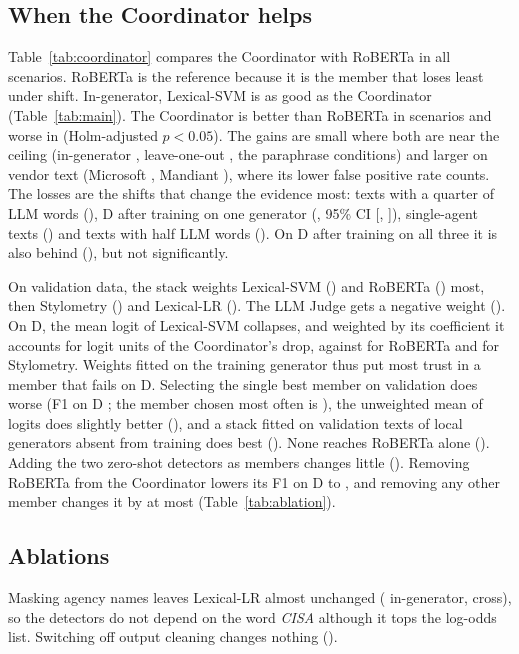 \documentclass[journal]{IEEEtran}
\begin{document}

\subsection{When the Coordinator helps}
Table~\ref{tab:coordinator} compares the Coordinator with RoBERTa in all \GapN{} scenarios. RoBERTa is the
reference because it is the member that loses least under shift. In-generator, Lexical-SVM is as good as the
Coordinator (Table~\ref{tab:main}). The Coordinator is better than RoBERTa in \GapWins{} scenarios and worse in
\GapLosses{} (Holm-adjusted $p<0.05$). The gains are small where both are near the ceiling (in-generator
\GapInGenerator{}, leave-one-out \GapLeaveOneOut{}, the paraphrase conditions) and larger on vendor text (Microsoft
\GapMicrosoftAbc{}, Mandiant \GapMandiantAbc{}), where its lower false positive rate counts. The losses are the
shifts that change the evidence most: texts with a quarter of LLM words (\GapTwoFiveLlmAbc{}), D after training on
one generator (\GapDOneGenerator{}, 95\% CI [\GapLoDOneGenerator{}, \GapHiDOneGenerator{}]), single-agent texts
(\GapSingleAgentAbc{}) and texts with half LLM words (\GapFiveZeroLlmAbc{}). On D after training on all three it is
also behind (\GapDAbc{}), but not significantly.

On validation data, the stack weights Lexical-SVM (\WgtLexsvm{}) and RoBERTa (\WgtTrans{}) most, then Stylometry
(\WgtStylo{}) and Lexical-LR (\WgtLexlr{}). The LLM Judge gets a negative weight (\WgtJudge{}). On D, the mean
logit of Lexical-SVM collapses, and weighted by its coefficient it accounts for \DropLexsvm{} logit units of the
Coordinator's drop, against \DropTrans{} for RoBERTa and \DropStylo{} for Stylometry. Weights fitted on the training
generator thus put most trust in a member that fails on D. Selecting the single best member on validation does
worse (F1 on D \ScDOneGeneratorBestVal{}; the member chosen most often is \BestValTop{}), the unweighted mean of
logits does slightly better (\ScDOneGeneratorCoordMean{}), and a stack fitted on validation texts of local
generators absent from training does best (\ScDOneGeneratorCoordUnseen{}). None reaches RoBERTa alone
(\ScDOneGeneratorTrans{}). Adding the two zero-shot detectors as members changes little
(\ScDOneGeneratorCoordZero{}). Removing RoBERTa from the Coordinator lowers its F1 on D to \CoordNoTransD{}, and
removing any other member changes it by at most \CoordDropMaxOther{} (Table~\ref{tab:ablation}).


\subsection{Ablations}
Masking agency names leaves Lexical-LR almost unchanged (\AblLrMaskedIn{} in-generator, \AblLrMaskedCross{} cross),
so the detectors do not depend on the word \emph{CISA} although it tops the log-odds list. Switching off output
cleaning changes nothing (\AblLrNoCleanIn{}).
\end{document}
